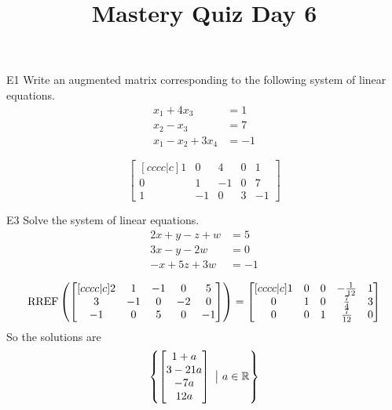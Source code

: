 \documentclass{sbgLAquiz}
\title{Mastery Quiz Day 6 }
\begin{document}
\begin{problem}{E1}
Write an augmented matrix corresponding to the following system of linear equations.
\begin{align*}
x_1+4x_3 &= 1 \\
x_2-x_3 &= 7 \\
x_1-x_2+3x_4 &= -1
\end{align*}
\end{problem}
\begin{solution}
\[
\begin{bmatrix}[cccc|c]
1 & 0 & 4 & 0 & 1 \\
0 & 1 & -1 & 0 & 7 \\
1 & -1 & 0 & 3 & -1
\end{bmatrix}
\]
\end{solution}

\begin{problem}{E3} 
Solve the system of linear equations.
\begin{align*}
2x+y-z+w &=5 \\
3x-y-2w &= 0 \\
-x+5z+3w&=-1
\end{align*}
\end{problem}
\begin{solution}
$$\operatorname{RREF}\left( \begin{bmatrix}[cccc|c] 2 & 1 & -1 & 0 & 5 \\ 3 & -1 & 0 & -2 & 0 \\ -1 & 0 & 5 & 0 & -1 \end{bmatrix} \right) = \begin{bmatrix}[cccc|c] 1 & 0 & 0 & -\frac{1}{12} & 1 \\ 0 & 1 & 0 & \frac{7}{4} & 3 \\ 0 & 0 & 1 & \frac{7}{12} & 0 \end{bmatrix}$$
So the solutions are $$\left\{ \begin{bmatrix} 1+a \\ 3-21a \\ -7a \\ 12a \end{bmatrix}\ \big|\ a \in \mathbb{R}\right\}$$
\end{solution}
\end{document}
